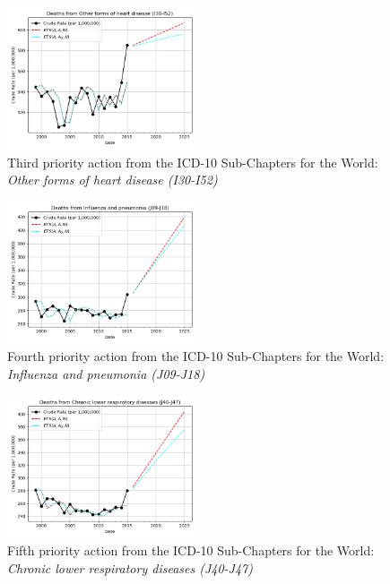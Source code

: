 \documentclass[10pt, a4paper, twocolumn]{IEEEconf}
\begin{document}
\begin{figure}[H]
  \centering
  \includegraphics[width=0.5\textwidth]{results/WORLD_ICD10_SUB_CHAPTERS/Other_forms_of_heart_disease_I30-I52_ets.png}
  \caption{Third priority action from the ICD-10 Sub-Chapters for the World: \textit{Other forms of heart disease (I30-I52)}}\label{fig:k11c}
\end{figure}

\begin{figure}[H]
  \centering
  \includegraphics[width=0.5\textwidth]{results/WORLD_ICD10_SUB_CHAPTERS/Influenza_and_pneumonia_J09-J18_ets.png}
  \caption{Fourth priority action from the ICD-10 Sub-Chapters for the World: \textit{Influenza and pneumonia (J09-J18)}}\label{fig:k11d}
\end{figure}

\begin{figure}[H]
  \centering
  \includegraphics[width=0.5\textwidth]{results/WORLD_ICD10_SUB_CHAPTERS/Chronic_lower_respiratory_diseases_J40-J47_ets.png}
  \caption{Fifth priority action from the ICD-10 Sub-Chapters for the World: \textit{Chronic lower respiratory diseases (J40-J47)}}\label{fig:k11e}
\end{figure}
\end{document}
